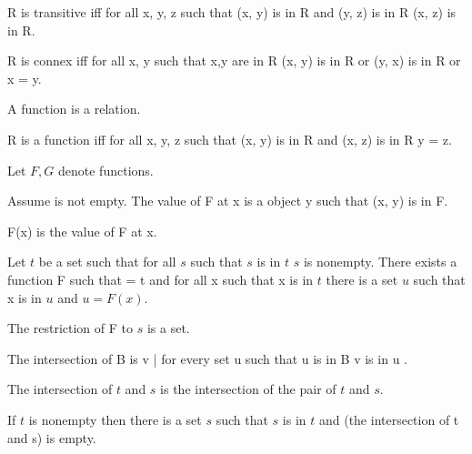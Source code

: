 \documentclass{article}
\begin{document}
\begin{forthel}
    \begin{definition}
      R is transitive iff for all x, y, z such that (x, y) is in R and (y, z) is in R (x, z) is in R.
    \end{definition}

    \begin{definition}
      R is connex iff for all x, y such that x,y are in R
        (x, y) is in R or (y, x) is in R or x = y.
    \end{definition}

    \begin{signature}
      A function is a relation.
    \end{signature}

    \begin{axiom}[FunctionIntro]
      R is a function iff for all x, y, z such that (x, y) is in R and (x, z) is in R y = z.
    \end{axiom}

    Let $F, G$ denote functions.

    \begin{definition}
      Assume  is not empty.
      The value of F at x is a object y such that (x, y) is in F.
    \end{definition}

    \begin{definition}
      F(x) is the value of F at x.
    \end{definition}

    \begin{axiom}[Choice]
      Let $t$ be a set such that for all $s$ such that $s$ is in $t$ $s$ is nonempty.
        There exists a function F such that  = t
        and for all x such that x is in $t$ there is a set $u$ such that x is in $u$ and $u = F(x)$.
    \end{axiom}

    \begin{axiom}[Replacement]
      The restriction of F to $s$ is a set.
    \end{axiom}

    \begin{definition}
      The intersection of B is { v | for every set u such that u is in B v is in u }.
    \end{definition}

    \begin{definition}
      The intersection of $t$ and $s$ is the intersection of the pair of $t$ and $s$.
    \end{definition}

    \begin{axiom}[Restriction]
      If $t$ is nonempty then there is a set $s$ such that $s$ is in $t$ and
        (the intersection of t and s) is empty.
    \end{axiom}
  \end{forthel}
\end{document}
